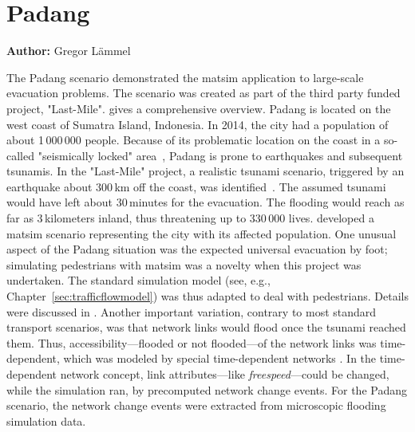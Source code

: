 \section{Padang}
\label{sec:padang}
\hfill \textbf{Author:} Gregor Lämmel


The Padang scenario demonstrated the \gls{matsim} application to large-scale evacuation problems. The scenario was created as part of the third party funded project, "Last-Mile". \citet{TaubenboeckEtAl2012ConcludingLastMilePaperNatHazards} gives a comprehensive overview.
Padang is located on the west coast of Sumatra Island, Indonesia. In 2014, the city had a population of about 1\,000\,000 people. 
Because of its problematic location on the coast in a so-called "seismically locked" area~\citep{McCloskey2010Padang2009Earthquake}, Padang is prone to earthquakes and subsequent tsunamis. In the "Last-Mile" project, a realistic tsunami scenario, triggered by an earthquake about 300\,km off the coast, was identified~\citep{GosebergSchlurmann2009HazardMappingPadang}. The assumed tsunami would have left about 30\,minutes for the evacuation. The flooding would reach as far as 3\,kilometers inland, thus threatening up to 330\,000 lives. \citet{Laemmel_PhDThesis_2011} developed a \gls{matsim} scenario representing the city with its affected population. One unusual aspect of the Padang situation was the expected universal evacuation by foot; simulating pedestrians with \gls{matsim} was a novelty when this project was undertaken. The standard simulation model (see, e.g.,\,Chapter~\ref{sec:trafficflowmodel}) was thus adapted to deal with pedestrians. 
Details were discussed in \citet{LaemmelKluepfelNagel2009EvacPadangAtBookTimmermanns}. Another important variation, contrary to most standard transport scenarios, was that network links would flood once the tsunami reached them. Thus, accessibility---flooded or not flooded---of the network links was time-dependent, which was modeled by special time-dependent networks \citep{LaemmelEtAl_TransResC_2010}. In the time-dependent network concept, link attributes---like \emph{freespeed}---could be changed, while the simulation ran, by precomputed network change events. For the Padang scenario, the network change events were extracted from microscopic flooding simulation data.

